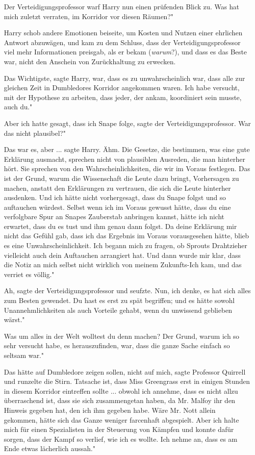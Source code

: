 Der Verteidigungsprofessor warf Harry nun einen prüfenden Blick zu. \glqq Was
hat mich zuletzt verraten, im Korridor vor diesen Räumen?"

Harry schob andere Emotionen beiseite, um Kosten und Nutzen einer ehrlichen
Antwort abzuwägen, und kam zu dem Schluss, dass der Verteidigungsprofessor viel
mehr Informationen preisgab, als er bekam (\emph{warum}?), und dass es das Beste
war, nicht den Anschein von Zurückhaltung zu erwecken.

\glqq Das Wichtigste\grqq{}, sagte Harry, \glqq war, dass es zu unwahrscheinlich
war, dass alle zur gleichen Zeit in Dumbledores Korridor angekommen waren. Ich
habe versucht, mit der Hypothese zu arbeiten, dass jeder, der ankam, koordiniert
sein musste, auch du."

\glqq Aber ich hatte gesagt, dass ich Snape folge\grqq{}, sagte der
Verteidigungsprofessor. \glqq War das nicht plausibel?"

\glqq Das war es, aber ...\grqq{} sagte Harry. \glqq Ähm. Die Gesetze, die
bestimmen, was eine gute Erklärung ausmacht, sprechen nicht von plausiblen
Ausreden, die man hinterher hört. Sie sprechen von den Wahrscheinlichkeiten, die
wir im Voraus festlegen. Das ist der Grund, warum die Wissenschaft die Leute
dazu bringt, Vorhersagen zu machen, anstatt den Erklärungen zu vertrauen, die
sich die Leute hinterher ausdenken. Und ich hätte nicht vorhergesagt, dass du
Snape folgst und so auftauchen würdest. Selbst wenn ich im Voraus gewusst hätte,
dass du eine verfolgbare Spur an Snapes Zauberstab anbringen kannst, hätte ich
nicht erwartet, dass du es tust und ihm genau dann folgst. Da deine Erklärung
mir nicht das Gefühl gab, dass ich das Ergebnis im Voraus vorausgesehen hätte,
blieb es eine Unwahrscheinlichkeit. Ich begann mich zu fragen, ob Sprouts
Drahtzieher vielleicht auch dein Auftauchen arrangiert hat. Und dann wurde mir
klar, dass die Notiz an mich selbst nicht wirklich von meinem Zukunfts-Ich kam,
und das verriet es völlig."

\glqq Ah\grqq{}, sagte der Verteidigungsprofessor und seufzte. \glqq Nun, ich
denke, es hat sich alles zum Besten gewendet. Du hast es erst zu spät begriffen;
und es hätte sowohl Unannehmlichkeiten als auch Vorteile gehabt, wenn du
unwissend geblieben wärst."

\glqq Was um alles in der Welt wolltest du denn machen? Der Grund, warum ich so
sehr versucht habe, es herauszufinden, war, dass die ganze Sache einfach so
seltsam war."

\glqq Das hätte auf Dumbledore zeigen sollen, nicht auf mich\grqq{}, sagte
Professor Quirrell und runzelte die Stirn. \glqq Tatsache ist, dass Miss
Greengrass erst in einigen Stunden in diesem Korridor eintreffen sollte ...
obwohl ich annehme, dass es nicht allzu überraschend ist, dass sie sich
zusammengetan haben, da Mr. Malfoy ihr den Hinweis gegeben hat, den ich ihm
gegeben habe. Wäre Mr. Nott allein gekommen, hätte sich das Ganze weniger
farcenhaft abgespielt. Aber ich halte mich für einen Spezialisten in der
Steuerung von Kämpfen und konnte dafür sorgen, dass der Kampf so verlief, wie
ich es wollte. Ich nehme an, dass es am Ende etwas lächerlich aussah."

